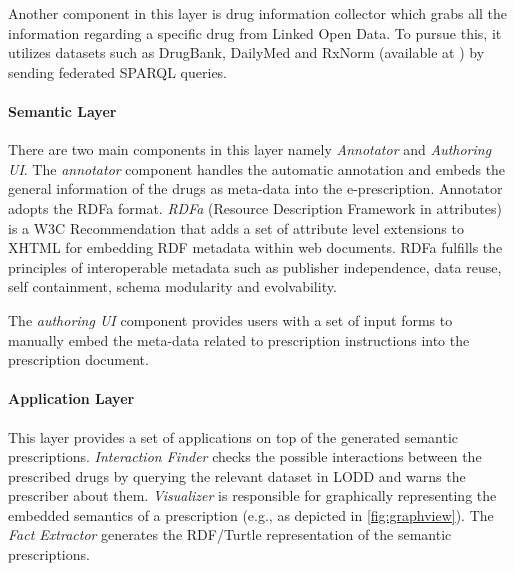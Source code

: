 \documentclass[journal]{IEEEtran}
\begin{document}
Another component in this layer is drug information collector which grabs all the information regarding a specific drug from Linked Open Data.
To pursue this, it utilizes datasets such as DrugBank, DailyMed and RxNorm (available at \cite{lodd}) by sending federated SPARQL queries.\\

\paragraph{Semantic Layer}
There are two main components in this layer namely \emph{Annotator} and \emph{Authoring UI}.
The \emph{annotator} component handles the automatic annotation and embeds the general information of the drugs as meta-data into the e-prescription.
Annotator adopts the RDFa format. \emph{RDFa} (Resource Description Framework in attributes) is a W3C Recommendation that adds a set of attribute level extensions to XHTML for embedding RDF metadata within web documents.
RDFa fulfills the principles of interoperable metadata such as publisher independence, data reuse, self containment, schema modularity and evolvability.

The \emph{authoring UI} component provides users with a set of input forms to manually embed the meta-data related to prescription instructions into the prescription document.\\

\paragraph{Application Layer}
This layer provides a set of applications on top of the generated semantic prescriptions.
\emph{Interaction Finder} checks the possible interactions between the prescribed drugs by querying the relevant dataset in LODD and warns the prescriber about them.
\emph{Visualizer} is responsible for graphically representing the embedded semantics of a prescription (e.g., as depicted in \autoref{fig:graphview}).
The \emph{Fact Extractor} generates the RDF/Turtle representation of the semantic prescriptions.
\end{document}
